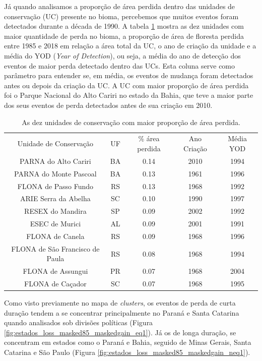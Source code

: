 Já quando analisamos a proporção de área perdida dentro das unidades de conservação (UC) presente no bioma, percebemos que muitos eventos foram detectados durante a década de 1990. A tabela \ref{tab:uc_loss} mostra as dez unidades com maior quantidade de perda no bioma, a proporção de área de floresta perdida entre 1985 e 2018 em relação a área total da UC, o ano de criação da unidade e a média do YOD (\textit{Year of Detection}), ou seja, a média do ano de detecção dos eventos de maior perda detectado dentro das UCs. Esta coluna serve como parâmetro para entender se, em média, os eventos de mudança foram detectados antes ou depois da criação da UC. A UC com maior proporção de área perdida foi o Parque Nacional do Alto Cariri no estado da Bahia, que teve a maior parte dos seus eventos de perda detectados antes de sua criação em 2010.

\begin{table}[H]
    \centering
    \begin{tabular}{|c | c | c | c | c|}
    \hline
            Unidade de Conservação & UF & \% área perdida & Ano Criação & Média YOD \\
                PARNA do Alto Cariri & BA & 0.14 & 2010 & 1994 \\ 
                PARNA do Monte Pascoal & BA & 0.13 & 1961 & 1996 \\
                FLONA de Passo Fundo & RS & 0.13 & 1968 & 1992 \\
                ARIE Serra da Abelha & SC & 0.10 & 1990 & 1997 \\
                RESEX do Mandira & SP & 0.09 & 2002 & 1992 \\
                ESEC de Murici & AL & 0.09 & 2001 & 1991 \\
                FLONA de Canela & RS & 0.09 & 1968 & 1996 \\
                FLONA de São Francisco de Paula & RS & 0.08 & 1968 & 1994 \\
                FLONA de Assungui & PR & 0.07 & 1968 & 2004 \\
                FLONA de Caçador & SC & 0.07 & 1968 & 1995 \\
    \hline
    \end{tabular}
    \caption{As dez unidades de conservação com maior proporção de área perdida.}
    \label{tab:uc_loss}
\end{table}


Como visto previamente no mapa de \textit{clusters}, os eventos de perda de curta duração tendem a se concentrar principalmente no Paraná e Santa Catarina quando analisados sob divisões políticas (Figura \ref{fig:estados_loss_masked85_maskedgain_eq1}). Já os de longa duração, se concentram em estados como o Paraná e Bahia, seguido de Minas Gerais, Santa Catarina e São Paulo (Figura \ref{fig:estados_loss_masked85_maskedgain_neq1}).


